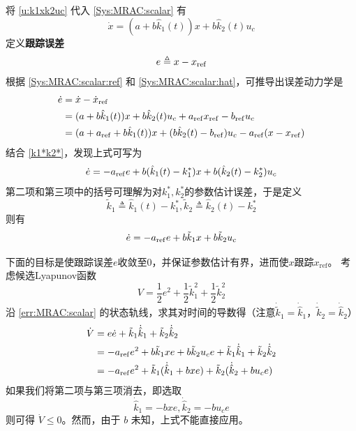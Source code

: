 将 \eqref{u:k1xk2uc} 代入 \eqref{Sys:MRAC:scalar} 有
\begin{equation}
  \dot{x} = (a + b \hat{k}_1 (t)) x + b \hat{k}_2 (t) u_c \label{Sys:MRAC:scalar:hat}
\end{equation}
定义{\bf 跟踪误差}
\begin{equation*}
  e \triangleq x - x_{\operatorname{ref}}
\end{equation*}
根据 \eqref{Sys:MRAC:scalar:ref} 和 \eqref{Sys:MRAC:scalar:hat}，可推导出误差动力学是
\begin{align}
  \dot{e} & = \dot{x} - \dot{x}_{\operatorname{ref}}\nonumber                                        \\
          & = (a + b \hat{k}_1 (t)) x + b \hat{k}_2 (t) u_c
  + a_{\operatorname{ref}} x_{\operatorname{ref}} - b_{\operatorname{ref}} u_c \nonumber                                   \\
          & = (a + a_{\operatorname{ref}} + b \hat{k}_1 (t)) x + (b \hat{k}_2 (t) - b_{\operatorname{ref}}) u_c
  - a_{\operatorname{ref}} (x - x_{\operatorname{ref}}) \nonumber
\end{align}
结合 \eqref{k1*k2*}，发现上式可写为
\[\dot{e} = - a_{\operatorname{ref}} e + b (\hat{k}_1(t)-k^{\ast}_1) x + b (\hat{k}_2 (t) - k^{\ast}_2) u_c\]
第二项和第三项中的括号可理解为对$k^{\ast}_1,k^{\ast}_2$的参数估计误差，于是定义
\[\tilde{k}_1 \triangleq\hat{k}_1 (t) - k^{\ast}_1,
  \tilde{k}_2 \triangleq \hat{k}_2 (t) - k^{\ast}_2\]
则有
\begin{equation}
  \dot{e} = - a_{\operatorname{ref}} e + b \tilde{k}_1 x + b \tilde{k}_2 u_c  \label{err:MRAC:scalar}
\end{equation}

下面的目标是使跟踪误差$e$收敛至$0$，并保证参数估计有界，进而使$x$跟踪$x_\mathrm{ref}$。
考虑候选Lyapunov函数
\begin{equation}
  V = \frac{1}{2} e^2 + \frac{1}{2} \tilde{k}^2_1 + \frac{1}{2} \tilde{k}^2_2\label{not_implement_candidate}
\end{equation}
沿 \eqref{err:MRAC:scalar} 的状态轨线，求其对时间的导数得（注意$\dot{\tilde{k}}_1=\dot{\hat{k}}_1$，$\dot{\tilde{k}}_2=\dot{\hat{k}}_2$）
\begin{align}
  \dot{V} & = e  \dot{e} + \tilde{k} _1 \dot{\hat{k}}_1 + \tilde{k} _2 \dot{\hat{k}}_2 \nonumber           \\
          & = - a_{\operatorname{ref}} e^2 + b \tilde{k} _1 x  e + b \tilde{k}_2 u_c e + \tilde{k} _1 \dot{\hat{k}}_1
  + \tilde{k} _2 \dot{\hat{k}}_2 \label{not_implement_vdot_mid}                                            \\
          & = - a_{\operatorname{ref}} e^2 + \tilde{k} _1 (\dot{\hat{k}}_1 + b  x  e)
  + \tilde{k} _2 (\dot{\hat{k}}_2 + b  u_c e)
  \label{not_implement_vdot}
\end{align}
如果我们将第二项与第三项消去，即选取
\begin{equation*}
  \dot{\hat{k}}_1 = - b  x  e, \dot{\hat{k}}_2 = - b  u_c e
\end{equation*}
则可得 $\dot{V} \leq 0$。然而，由于 $b$ 未知，上式不能直接应用。

